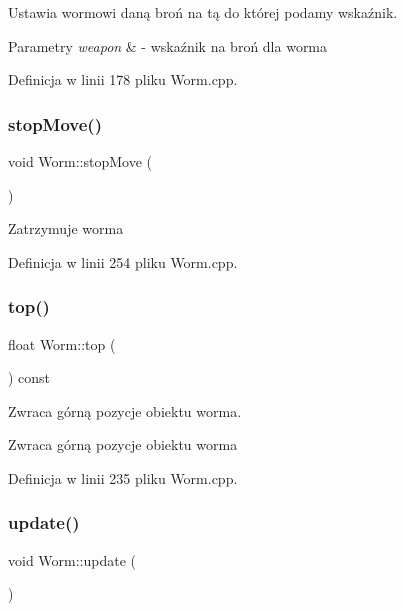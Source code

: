Ustawia wormowi daną broń na tą do której podamy wskaźnik. 


\begin{DoxyParams}{Parametry}
{\em weapon} & -\/ wskaźnik na broń dla worma \\
\hline
\end{DoxyParams}


Definicja w linii 178 pliku Worm.\+cpp.

\mbox{\label{class_worm_a1cdb0c544127417ba4b95fd8e5d3f9fc}} 
\subsubsection{\texorpdfstring{stop\+Move()}{stopMove()}}
{\footnotesize\ttfamily void Worm\+::stop\+Move (\begin{DoxyParamCaption}{ }\end{DoxyParamCaption})}

Zatrzymuje worma 

Definicja w linii 254 pliku Worm.\+cpp.

\mbox{\label{class_worm_a3d65c40350e8e0317bd594a3cb7c8bba}} 
\subsubsection{\texorpdfstring{top()}{top()}}
{\footnotesize\ttfamily float Worm\+::top (\begin{DoxyParamCaption}{ }\end{DoxyParamCaption}) const}



Zwraca górną pozycje obiektu worma. 

\begin{DoxyReturn}{Zwraca}
górną pozycje obiektu worma 
\end{DoxyReturn}


Definicja w linii 235 pliku Worm.\+cpp.

\mbox{\label{class_worm_adcb6219ae98887e491327c4ef02cf4b9}} 
\subsubsection{\texorpdfstring{update()}{update()}}
{\footnotesize\ttfamily void Worm\+::update (\begin{DoxyParamCaption}{ }\end{DoxyParamCaption})}



